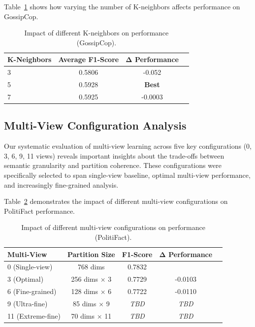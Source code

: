 Table~\ref{tab:hyperparameter_k_neighbors_gossipcop} shows how varying the number of K-neighbors affects performance on GossipCop.

\begin{table}[htbp]
\centering
\caption{Impact of different K-neighbors on performance (GossipCop).}
\label{tab:hyperparameter_k_neighbors_gossipcop}
\begin{tabular}{lccc}
\toprule
\textbf{K-Neighbors} & \textbf{Average F1-Score} & \textbf{Δ Performance} \\
\midrule
3 & 0.5806 & -0.052 \\
5 & 0.5928 & \textbf{Best} \\
7 & 0.5925 & -0.0003 \\
\bottomrule
\end{tabular}
\end{table}

\subsection{Multi-View Configuration Analysis}

Our systematic evaluation of multi-view learning across five key configurations (0, 3, 6, 9, 11 views) reveals important insights about the trade-offs between semantic granularity and partition coherence. These configurations were specifically selected to span single-view baseline, optimal multi-view performance, and increasingly fine-grained analysis.

Table~\ref{tab:hyperparameter_multi_view_politifact} demonstrates the impact of different multi-view configurations on PolitiFact performance.

\begin{table}[htbp]
\centering
\caption{Impact of different multi-view configurations on performance (PolitiFact).}
\label{tab:hyperparameter_multi_view_politifact}
\begin{tabular}{lcccc}
\toprule
\textbf{Multi-View} & \textbf{Partition Size} & \textbf{F1-Score} & \textbf{Δ Performance} \\
\midrule
0 (Single-view) & 768 dims & 0.7832 & \- \\
3 (Optimal) & 256 dims × 3 & 0.7729 & -0.0103 \\
6 (Fine-grained) & 128 dims × 6 & 0.7722 & -0.0110 \\
9 (Ultra-fine) & 85 dims × 9 & \textit{TBD} & \textit{TBD} \\
11 (Extreme-fine) & 70 dims × 11 & \textit{TBD} & \textit{TBD} \\
\bottomrule
\end{tabular}
\end{table}

